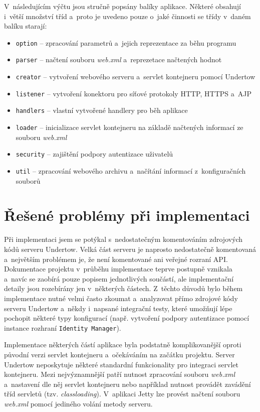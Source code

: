             V~následujícím výčtu jsou stručně popsány balíky aplikace.
            Některé obsahují i~větší množství tříd a~proto je uvedeno pouze o~jaké činnosti
            se třídy v~daném balíku starají:
            \begin{itemize}
                \item \texttt{option} -- zpracování parametrů a~jejich reprezentace za běhu programu
                \item \texttt{parser} -- načtení souboru \emph{web.xml} a~reprezetace načtených hodnot
                \item \texttt{creator} -- vytvoření webového serveru a~servlet kontejneru pomocí Undertow
                \item \texttt{listener} -- vytvoření konektoru pro síťové protokoly HTTP, HTTPS a~AJP
                \item \texttt{handlers} -- vlastní vytvořené handlery pro běh aplikace
                \item \texttt{loader} -- inicializace servlet kontejneru na základě načtených informací ze souboru \emph{web.xml}
                \item \texttt{security} -- zajištění podpory autentizace uživatelů
                \item \texttt{util} -- zpracování webového archivu a~načítání informací z~konfiguračních souborů
            \end{itemize}




    \section{Řešené problémy při implementaci}
        Při implementaci jsem se potýkal s~nedostatečným komentováním zdrojových kódů serveru Undertow.
        Velká část serveru je naprosto nedostatečně komentovaná a~největším problémem je, že
        není komentované ani veřejné rozraní API. 
        Dokumentace projektu v~průběhu implementace teprve postupně vznikala a~navíc se zaobírá pouze popisem jednotlivých součástí,
        ale implementační detaily jsou rozebírány jen v~některých částech.
        Z~těchto důvodů bylo během implementace nutné velmi často zkoumat a~analyzovat přímo zdrojové kódy serveru Undertow
        a~někdy i~napsané integrační testy, které umožňují lépe pochopit některé typy konfigurací (např. vytvoření podpory autentizace
        pomocí instance rozhraní \texttt{Identity Manager}).

        Implementace některých částí aplikace byla podstatně komplikovanější oproti původní verzi servlet kontejneru
        a~očekáváním na začátku projektu. Server Undertow 
        neposkytuje některé standardní funkcionality pro integraci servlet kontejneru. Mezi nejvýznamnější patří nutnost
        zpracování souboru \emph{web.xml} a~nastavení dle něj servlet kontejneru nebo například nutnost 
        provádět zavádění tříd servletů (tzv. \emph{classloading}). V~aplikaci Jetty lze provést načtení 
        souboru \emph{web.xml} pomocí jediného volání metody serveru.

